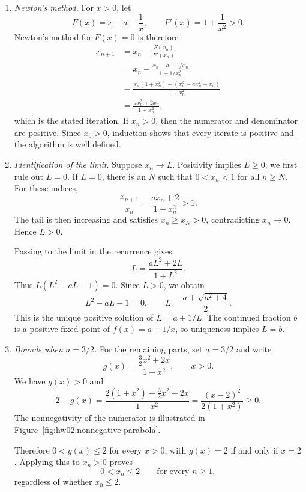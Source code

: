 \leavevmode
\begin{enumerate}
  \item \textit{Newton's method.}
    For $x>0$, let
    \[
      F(x)=x-a-\frac1x,\qquad F'(x)=1+\frac1{x^2}>0.
    \]
    Newton's method for $F(x)=0$ is therefore
    \[
      \begin{aligned}
        x_{n+1}
          &=x_n-\frac{F(x_n)}{F'(x_n)}\\
          &=x_n-\frac{x_n-a-1/x_n}{1+1/x_n^2}\\
          &=\frac{x_n(1+x_n^2)-(x_n^3-ax_n^2-x_n)}{1+x_n^2}\\
          &=\frac{ax_n^2+2x_n}{1+x_n^2},
      \end{aligned}
    \]
    which is the stated iteration. If $x_n>0$, then the numerator
    and denominator are positive. Since $x_0>0$, induction shows
    that every iterate is positive and the algorithm is well defined.

  \item \textit{Identification of the limit.}
    Suppose $x_n\to L$. Positivity implies $L\geq0$; we first
    rule out $L=0$. If $L=0$, there is an $N$ such that
    $0<x_n<1$ for all $n\geq N$. For these indices,
    \[
      \frac{x_{n+1}}{x_n}
        =\frac{ax_n+2}{1+x_n^2}>1.
    \]
    The tail is then increasing and satisfies $x_n\geq x_N>0$,
    contradicting $x_n\to0$. Hence $L>0$.

    Passing to the limit in the recurrence gives
    \[
      L=\frac{aL^2+2L}{1+L^2}.
    \]
    Thus $L(L^2-aL-1)=0$. Since $L>0$, we obtain
    \[
      L^2-aL-1=0,\qquad
      L=\frac{a+\sqrt{a^2+4}}2.
    \]
    This is the unique positive solution of $L=a+1/L$.
    The continued fraction $b$ is a positive fixed point of
    $f(x)=a+1/x$, so uniqueness implies $L=b$.

  \item \textit{Bounds when $a=3/2$.}
    For the remaining parts, set $a=3/2$ and write
    \[
      g(x)=\frac{\tfrac32x^2+2x}{1+x^2},\qquad x>0.
    \]
    We have $g(x)>0$ and
    \[
      2-g(x)
        =\frac{2(1+x^2)-\tfrac32x^2-2x}{1+x^2}
        =\frac{(x-2)^2}{2(1+x^2)}\geq0.
    \]
    The nonnegativity of the numerator is illustrated in
    Figure~\ref{fig:hw02:nonnegative-parabola}.
    \begin{marginfigure}
      \centering
      
      \caption{The numerator $(x-2)^2$ is nonnegative,
        with equality only at $x=2$.}
      \label{fig:hw02:nonnegative-parabola}
    \end{marginfigure}
    Therefore $0<g(x)\leq2$ for every $x>0$, with $g(x)=2$
    if and only if $x=2$. Applying this to $x_n>0$ proves
    \[
      0<x_n\leq2\qquad\text{for every }n\geq1,
    \]
    regardless of whether $x_0\leq2$.


\end{enumerate}
